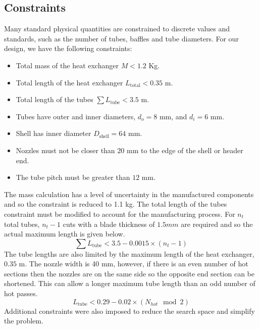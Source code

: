 \documentclass{article}
\begin{document}
\subsection{Constraints}

Many standard physical quantities are constrained to discrete values and standards, such as the number of tubes, baffles and tube diameters.
For our design, we have the following constraints:
\begin{itemize}
  \item Total mass of the heat exchanger $M < 1.2$ Kg.
  \item Total length of the heat exchanger $L_{\text{total}} < 0.35$ m.
  \item Total length of the tubes $\sum L_{\text{tube}} < 3.5$ m.
  \item Tubes have outer and inner diameters, $d_{o} = 8$ mm, and $d_{i} = 6$ mm.
  \item Shell has inner diameter $D_{\text{shell}} = 64$ mm.
  \item Nozzles must not be closer than $20$ mm to the edge of the shell or header end.
  \item The tube pitch must be greater than $12$ mm.
\end{itemize}

\newpage

The mass calculation has a level of uncertainty in the manufactured components and so the constraint is reduced to 1.1 kg.
The total length of the tubes constraint must be modified to account for the manufacturing process.
For $n_t$ total tubes, $n_t - 1$ cuts with a blade thickness of $1.5 mm$ are required and so the actual maximum length is given below.
\vspace{5pt}
\begin{equation}
  \sum L_\text{tube} < 3.5 - 0.0015 \times (n_t - 1)
\end{equation}
\vspace{5pt}
The tube lengths are also limited by the maximum length of the heat exchanger, $0.35$ m.
The nozzle width is 40 mm, however, if there is an even number of hot sections then the nozzles are on the same side so the opposite end section can be shortened.
This can allow a longer maximum tube length than an odd number of hot passes.
\vspace{5pt}
\begin{equation}
  L_\text{tube} < 0.29 - 0.02 \times ( N_{hot}\mod 2)
\end{equation}
\vspace{5pt}
Additional constraints were also imposed to reduce the search space and simplify the problem.
\end{document}
